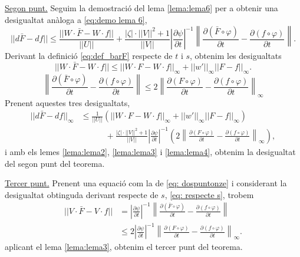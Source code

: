 {\underline{Segon punt.}
Seguim la demostració del lema \ref{lema:lema6} per a obtenir una desigualtat anàloga a \ref{eq:demo lema 6},
\begin{equation*}
    ||d\bar F-df||\le \frac{||W\cdot\bar F - W\cdot f||}{||U||} + \frac{|\zeta|\cdot||V||^2+1}{||V||}\left|\frac{\partial\psi}{\partial t}\right|^{-1} \left\| \frac{\partial(\bar F\circ\varphi)}{\partial t} - \frac{\partial(f\circ\varphi)}{\partial t} \right\|.
\end{equation*}
Derivant la definició \ref{eq:def_barF} respecte de $t$ i $s$, obtenim les desigualtats
\begin{equation}\label{eq: respecte t}
    ||W\cdot\bar F - W\cdot f|| \le ||W\cdot F - W\cdot f||_\infty + ||w'||_\infty||F - f||_\infty.
\end{equation}
\begin{equation}\label{eq: respecte s}
    \left\| \frac{\partial(\bar F\circ\varphi)}{\partial t} - \frac{\partial(f\circ\varphi)}{\partial t} \right\| \le 2\left\| \frac{\partial(F\circ\varphi)}{\partial t} - \frac{\partial(f\circ\varphi)}{\partial t} \right\|_\infty
\end{equation}
Prenent aquestes tres desigualtats, 
\begin{align*}
    ||d\bar F-df||_\infty
    &\le\frac{1}{||U||}\left(||W\cdot F - W\cdot f||_\infty + ||w'||_\infty||F - f||_\infty\right) 
    \\&\quad\quad\quad+ \frac{|\zeta|\cdot||V||^2+1}{||V||}\left|\frac{\partial\psi}{\partial t}\right|^{-1}\left( 2\left\| \frac{\partial(F\circ\varphi)}{\partial t} - \frac{\partial(f\circ\varphi)}{\partial t} \right\|_\infty\right),
\end{align*}
i amb els lemes \ref{lema:lema2}, \ref{lema:lema3} i \ref{lema:lema4}, obtenim la desigualtat del segon punt del teorema.

\underline{Tercer punt.}
Prenent una equació com la de \ref{eq: dospuntonze} i considerant la desigualtat obtinguda derivant respecte de $s$, \ref{eq: respecte s}, trobem
\begin{align*}
    ||V\cdot \bar F - V\cdot f|| &= \left|\frac{\partial\psi}{\partial t}\right|^{-1} \left\| \frac{\partial(\bar F\circ\varphi)}{\partial t} - \frac{\partial(f\circ\varphi)}{\partial t} \right\|\\
    &\le 2\left|\frac{\partial\psi}{\partial t}\right|^{-1} \left\| \frac{\partial(F\circ\varphi)}{\partial t} - \frac{\partial(f\circ\varphi)}{\partial t} \right\|_\infty.
\end{align*}
aplicant el lema \ref{lema:lema3}, obtenim el tercer punt del teorema.

}
